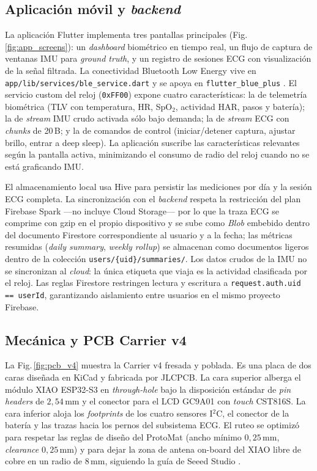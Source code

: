 \documentclass[letterpaper,11pt]{article}
\newcommand{\rfigura}[1]{Fig.\,\ref{#1}}
\begin{document}
\subsection{Aplicaci\'on m\'ovil y \textit{backend}}

La aplicaci\'on Flutter \cite{flutter} implementa tres pantallas principales (\rfigura{fig:app_screens}): un \textit{dashboard} biom\'etrico en tiempo real, un flujo de captura de ventanas IMU para \textit{ground truth}, y un registro de sesiones ECG con visualizaci\'on de la se\~nal filtrada. La conectividad Bluetooth Low Energy vive en \texttt{app/lib/services/ble\_service.dart} y se apoya en \texttt{flutter\_blue\_plus} \cite{flutterbluepl}. El servicio custom del reloj (\texttt{0xFF00}) expone cuatro caracter\'isticas: la de telemetr\'ia biom\'etrica (TLV con temperatura, HR, SpO$_2$, actividad HAR, pasos y bater\'ia); la de \textit{stream} IMU crudo activada s\'olo bajo demanda; la de \textit{stream} ECG con \textit{chunks} de 20\,B; y la de comandos de control (iniciar/detener captura, ajustar brillo, entrar a deep sleep). La aplicaci\'on suscribe las caracter\'isticas relevantes seg\'un la pantalla activa, minimizando el consumo de radio del reloj cuando no se est\'a graficando IMU.

El almacenamiento local usa Hive \cite{hive_db} para persistir las mediciones por d\'ia y la sesi\'on ECG completa. La sincronizaci\'on con el \textit{backend} respeta la restricci\'on del plan Firebase Spark ---no incluye Cloud Storage--- por lo que la traza ECG se comprime con gzip en el propio dispositivo y se sube como \textit{Blob} embebido dentro del documento Firestore correspondiente al usuario y a la fecha; las m\'etricas resumidas (\textit{daily summary}, \textit{weekly rollup}) se almacenan como documentos ligeros dentro de la colecci\'on \texttt{users/\{uid\}/summaries/}. Los datos crudos de la IMU no se sincronizan al \textit{cloud}: la \'unica etiqueta que viaja es la actividad clasificada por el reloj. Las reglas Firestore \cite{firestore_rules} restringen lectura y escritura a \texttt{request.auth.uid == userId}, garantizando aislamiento entre usuarios en el mismo proyecto Firebase.

\subsection{Mec\'anica y PCB Carrier v4}

La \rfigura{fig:pcb_v4} muestra la Carrier v4 fresada y poblada. Es una placa de dos caras dise\~nada en KiCad \cite{kicad} y fabricada por JLCPCB. La cara superior alberga el m\'odulo XIAO ESP32-S3 en \textit{through-hole} bajo la disposici\'on est\'andar de \textit{pin headers} de $2{,}54$\,mm y el conector para el LCD GC9A01 con \textit{touch} CST816S. La cara inferior aloja los \textit{footprints} de los cuatro sensores I$^2$C, el conector de la bater\'ia y las trazas hacia los pernos del subsistema ECG. El ruteo se optimiz\'o para respetar las reglas de dise\~no del ProtoMat (ancho m\'inimo $0{,}25$\,mm, \textit{clearance} $0{,}25$\,mm) y para dejar la zona de antena on-board del XIAO libre de cobre en un radio de $8$\,mm, siguiendo la gu\'ia de Seeed Studio \cite{xiao_esp32s3_pinout}.
\end{document}
